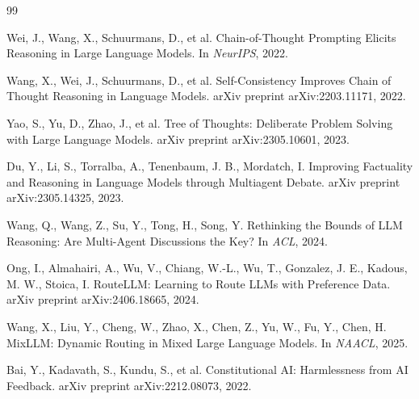 \documentclass[11pt,a4paper]{ctexart}
\begin{document}
\begin{thebibliography}{99}

Wei, J., Wang, X., Schuurmans, D., et al.
\newblock Chain-of-Thought Prompting Elicits Reasoning in Large Language Models.
\newblock In \emph{NeurIPS}, 2022.

Wang, X., Wei, J., Schuurmans, D., et al.
\newblock Self-Consistency Improves Chain of Thought Reasoning in Language Models.
\newblock arXiv preprint arXiv:2203.11171, 2022.

Yao, S., Yu, D., Zhao, J., et al.
\newblock Tree of Thoughts: Deliberate Problem Solving with Large Language Models.
\newblock arXiv preprint arXiv:2305.10601, 2023.

Du, Y., Li, S., Torralba, A., Tenenbaum, J. B., Mordatch, I.
\newblock Improving Factuality and Reasoning in Language Models through Multiagent Debate.
\newblock arXiv preprint arXiv:2305.14325, 2023.

Wang, Q., Wang, Z., Su, Y., Tong, H., Song, Y.
\newblock Rethinking the Bounds of LLM Reasoning: Are Multi-Agent Discussions the Key?
\newblock In \emph{ACL}, 2024.

Ong, I., Almahairi, A., Wu, V., Chiang, W.-L., Wu, T., Gonzalez, J. E., Kadous, M. W., Stoica, I.
\newblock RouteLLM: Learning to Route LLMs with Preference Data.
\newblock arXiv preprint arXiv:2406.18665, 2024.

Wang, X., Liu, Y., Cheng, W., Zhao, X., Chen, Z., Yu, W., Fu, Y., Chen, H.
\newblock MixLLM: Dynamic Routing in Mixed Large Language Models.
\newblock In \emph{NAACL}, 2025.

Bai, Y., Kadavath, S., Kundu, S., et al.
\newblock Constitutional AI: Harmlessness from AI Feedback.
\newblock arXiv preprint arXiv:2212.08073, 2022.

\end{thebibliography}
\end{document}
